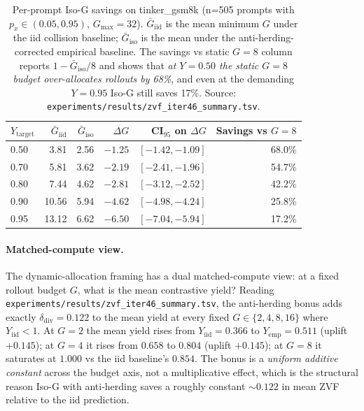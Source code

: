 \begin{table}[htbp]
\centering\small
\setlength{\tabcolsep}{4pt}
\begin{tabular}{lrrrrr}
\hline
$Y_{\mathrm{target}}$ & $\bar G_{\mathrm{iid}}$ & $\bar G_{\mathrm{iso}}$ &
$\Delta G$ & CI$_{95}$ on $\Delta G$ & Savings vs $G{=}8$ \\
\hline
0.50 & 3.81 & 2.56 & $-1.25$ & $[-1.42, -1.09]$ & 68.0\% \\
0.70 & 5.81 & 3.62 & $-2.19$ & $[-2.41, -1.96]$ & 54.7\% \\
0.80 & 7.44 & 4.62 & $-2.81$ & $[-3.12, -2.52]$ & 42.2\% \\
0.90 & 10.56 & 5.94 & $-4.62$ & $[-4.98, -4.24]$ & 25.8\% \\
0.95 & 13.12 & 6.62 & $-6.50$ & $[-7.04, -5.94]$ & 17.2\% \\
\hline
\end{tabular}
\caption{Per-prompt Iso-G savings on tinker\_gsm8k (n=505 prompts with
$p_x \in (0.05, 0.95)$, $G_{\max}{=}32$). $\bar G_{\mathrm{iid}}$ is the
mean minimum $G$ under the iid collision baseline; $\bar G_{\mathrm{iso}}$
is the mean under the anti-herding-corrected empirical baseline. The
savings vs static $G{=}8$ column reports $1 - \bar G_{\mathrm{iso}}/8$
and shows that \emph{at $Y{=}0.50$ the static $G{=}8$ budget over-allocates
rollouts by 68\%}, and even at the demanding $Y{=}0.95$ Iso-G still
saves 17\%. Source: \texttt{experiments/results/zvf_iter46_summary.tsv}.}
\label{tab:zvf-isog-savings}
\end{table}

\paragraph{Matched-compute view.}
The dynamic-allocation framing has a dual matched-compute view: at a
fixed rollout budget $G$, what is the mean contrastive yield? Reading
\texttt{experiments/results/zvf_iter46_summary.tsv}, the anti-herding
bonus adds exactly $\delta_{\mathrm{div}} = 0.122$ to the mean yield
at every fixed $G \in \{2, 4, 8, 16\}$ where $Y_{\mathrm{iid}} < 1$.
At $G{=}2$ the mean yield rises from $Y_{\mathrm{iid}}{=}0.366$ to
$Y_{\mathrm{emp}}{=}0.511$ (uplift $+0.145$); at $G{=}4$ it rises
from $0.658$ to $0.804$ (uplift $+0.145$); at $G{=}8$ it saturates
at $1.000$ vs the iid baseline's $0.854$. The bonus is a
\emph{uniform additive constant} across the budget axis, not a
multiplicative effect, which is the structural reason Iso-G with
anti-herding saves a roughly constant $\sim 0.122$ in mean ZVF
relative to the iid prediction.

